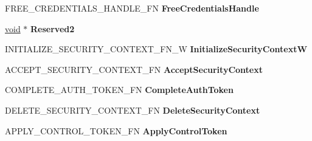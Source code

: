 \begin{DoxyCompactItemize}
F\+R\+E\+E\+\_\+\+C\+R\+E\+D\+E\+N\+T\+I\+A\+L\+S\+\_\+\+H\+A\+N\+D\+L\+E\+\_\+\+FN {\bfseries Free\+Credentials\+Handle}
\item 
\mbox{\label{struct___s_e_c_u_r_i_t_y___f_u_n_c_t_i_o_n___t_a_b_l_e___w_af4e18735ede2df83d394a3b3f088e4b6}} 
\hyperlink{interfacevoid}{void} $\ast$ {\bfseries Reserved2}
\item 
\mbox{\label{struct___s_e_c_u_r_i_t_y___f_u_n_c_t_i_o_n___t_a_b_l_e___w_a110b161cf9492c68fb9090ac083de292}} 
I\+N\+I\+T\+I\+A\+L\+I\+Z\+E\+\_\+\+S\+E\+C\+U\+R\+I\+T\+Y\+\_\+\+C\+O\+N\+T\+E\+X\+T\+\_\+\+F\+N\+\_\+W {\bfseries Initialize\+Security\+ContextW}
\item 
\mbox{\label{struct___s_e_c_u_r_i_t_y___f_u_n_c_t_i_o_n___t_a_b_l_e___w_a085432ff4297a5613e650a408dd9cbe4}} 
A\+C\+C\+E\+P\+T\+\_\+\+S\+E\+C\+U\+R\+I\+T\+Y\+\_\+\+C\+O\+N\+T\+E\+X\+T\+\_\+\+FN {\bfseries Accept\+Security\+Context}
\item 
\mbox{\label{struct___s_e_c_u_r_i_t_y___f_u_n_c_t_i_o_n___t_a_b_l_e___w_aaa56d7b45a6ab8238b2b13b6ae8666ee}} 
C\+O\+M\+P\+L\+E\+T\+E\+\_\+\+A\+U\+T\+H\+\_\+\+T\+O\+K\+E\+N\+\_\+\+FN {\bfseries Complete\+Auth\+Token}
\item 
\mbox{\label{struct___s_e_c_u_r_i_t_y___f_u_n_c_t_i_o_n___t_a_b_l_e___w_a204686f0eebc00ef9b951e6fc7198dec}} 
D\+E\+L\+E\+T\+E\+\_\+\+S\+E\+C\+U\+R\+I\+T\+Y\+\_\+\+C\+O\+N\+T\+E\+X\+T\+\_\+\+FN {\bfseries Delete\+Security\+Context}
\item 
\mbox{\label{struct___s_e_c_u_r_i_t_y___f_u_n_c_t_i_o_n___t_a_b_l_e___w_aca881f7587863e0d473171a1c5125809}} 
A\+P\+P\+L\+Y\+\_\+\+C\+O\+N\+T\+R\+O\+L\+\_\+\+T\+O\+K\+E\+N\+\_\+\+FN {\bfseries Apply\+Control\+Token}
\item 
\mbox{\label{struct___s_e_c_u_r_i_t_y___f_u_n_c_t_i_o_n___t_a_b_l_e___w_ad68f9848241f4b1dfab5f828327ab4be}} 

\end{DoxyCompactItemize}
